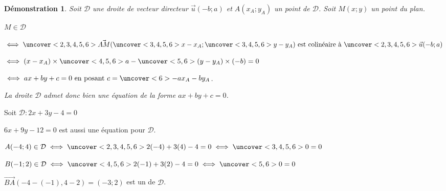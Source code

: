 \documentclass{beamer}
\newtheorem{demonstration}[theorem]{Démonstration}
\begin{document}
  \begin{frame}
  \begin{demonstration}
    
    Soit $\mathcal{D}$ une droite de vecteur directeur $\vec{u}(-b;a)$ et $A(x_A;y_A)$ un point de 
    $\mathcal{D}$. Soit $M(x;y)$ un point du plan.
    
    $M \in \mathcal{D}$
    
    $\iff \uncover<2,3,4,5,6>{\vec{AM}}(\uncover<3,4,5,6>{x-x_A};\uncover<3,4,5,6>{y-y_A}) 
    \textrm{ est colinéaire à } \uncover<2,3,4,5,6>{\vec{u}(-b;a)}$
    
    $\iff (x-x_A)\times \uncover<4,5,6>{a} -\uncover<5,6>{(y-y_A)} \times (-b)=0$ 
    
    $\iff ax+by+c=0 \textrm{ en posant }c=\uncover<6>{-ax_A-by_A}$.
    
    La droite $\mathcal{D}$ admet donc bien une équation de la forme $ax+by+c=0$.
   \end{demonstration}
   
   \end{frame}
  
       \begin{frame}
    
   \begin{example}
    Soit $\mathcal{D}:2 x+3 y-4=0$
   
   $6x+9y-12=0$ est aussi une équation pour $\mathcal{D}$.
   
   $A(-4;4) \in \mathcal{D} \iff \uncover<2,3,4,5,6>{2(-4)+3(4)-4=0} \iff \uncover<3,4,5,6>{0=0}$
   
   
   $B(-1;2) \in \mathcal{D} \iff \uncover<4,5,6>{2(-1)+3(2)-4=0} \iff \uncover<5,6>{0=0}$
   
  
   $\vec{BA}(-4-(-1),4-2)=(-3;2)$ est un  de $\mathcal{D}$.
   \end{example}
   
   \end{frame}
  
\end{document}
